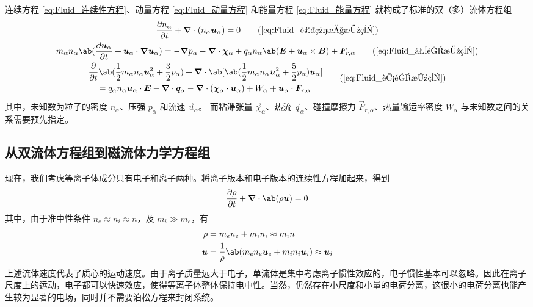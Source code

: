 连续方程 \ref{eq:Fluid_连续性方程}、动量方程 \ref{eq:Fluid_动量方程} 和能量方程 \ref{eq:Fluid_能量方程} 就构成了标准的双（多）流体方程组
\begin{gather}
\pdv{n_\alpha}{t} + \dive{(n_\alpha \vec{u}_\alpha)} = 0
\tag{\ref{eq:Fluid_连续性方程}} \\
m_\alpha n_\alpha \ab(
    \pdv{\vec{u}_\alpha}{t} + \vec{u}_\alpha \cdot \grad{\vec{u}_\alpha}
)
= - \grad{p_\alpha} - \dive{\vec{\chi}_\alpha} + q_\alpha n_\alpha \ab( \vec{E} + \vec{u}_\alpha \times \vec{B} ) + \vec{F}_{r,\alpha}
\tag{\ref{eq:Fluid_动量方程}} \\
\begin{aligned}
& \pdv{}{t} \ab(
    \frac{1}{2} m_\alpha n_\alpha \vec{u}_\alpha^2 + \frac{3}{2} p_\alpha
)
+ \dive{\ab[
    \ab(\frac{1}{2} m_\alpha n_\alpha \vec{u}_\alpha^2
    + \frac{5}{2} p_\alpha ) \vec{u}_\alpha
]} \\
& \quad = q_\alpha n_\alpha \vec{u}_\alpha \cdot \vec{E}
- \dive{\vec{q}_\alpha}
- \dive{(\vec{\chi}_\alpha \cdot \vec{u}_\alpha)}
+ W_\alpha + \vec{u}_\alpha \cdot \vec{F}_{r,\alpha}
\end{aligned}
\tag{\ref{eq:Fluid_能量方程}}
\end{gather}
其中，未知数为粒子的密度 $n_\alpha$、压强 $p_\alpha$ 和流速 $\vec{u}_\alpha$。
而粘滞张量 $\vec{\chi}_\alpha$、热流 $\vec{q}_\alpha$、碰撞摩擦力 $\vec{F}_{r,\alpha}$、热量输运率密度 $W_\alpha$ 与未知数之间的关系需要预先指定。

\subsection{从双流体方程组到磁流体力学方程组}

现在，我们考虑等离子体成分只有电子和离子两种。将离子版本和电子版本的连续性方程加起来，得到
\begin{equation}
\pdv{\rho}{t} + \dive{\ab(\rho \vec{u})} = 0
\end{equation}
其中，由于准中性条件 $n_e \approx n_i \approx n$，及 $m_i \gg m_e$，有
\begin{align}
\rho &= m_e n_e + m_i n_i \approx m_i n \\
\vec{u} &= \frac{1}{\rho} \ab( m_e n_e \vec{u}_e + m_i n_i \vec{u}_i )
\approx \vec{u}_i
\end{align}
上述流体速度代表了质心的运动速度。由于离子质量远大于电子，单流体是集中考虑离子惯性效应的，电子惯性基本可以忽略。因此在离子尺度上的运动，电子都可以快速效应，使得等离子体整体保持电中性。当然，仍然存在小尺度和小量的电荷分离，这很小的电荷分离也能产生较为显著的电场，同时并不需要泊松方程来封闭系统。

